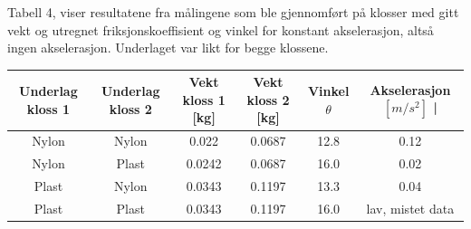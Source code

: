 \documentclass[10pt,a4paper]{report}
\begin{document}
\begin{center}
     \begin{tablenotes}
 	\small
 	\item Tabell 4, viser resultatene fra målingene som ble gjennomført på klosser med gitt vekt og utregnet friksjonskoeffisient og vinkel for konstant akselerasjon, altså ingen akselerasjon. Underlaget var likt for begge klossene.
 	\end{tablenotes}
  \begin{tabular}{| c | c | c | c | c  | c |}
    \hline
    Underlag kloss 1 & Underlag kloss 2 & Vekt kloss 1 [kg] & Vekt kloss 2 [kg] & Vinkel $\theta$ & Akselerasjon $[m/s^2]$ | \\ \hline
    Nylon & Nylon & 0.022 & 0.0687 & 12.8 & 0.12 \\ \hline
    Nylon & Plast & 0.0242 & 0.0687 & 16.0 & 0.02 \\ \hline
    Plast & Nylon & 0.0343 & 0.1197 & 13.3 & 0.04 \\ \hline
    Plast & Plast & 0.0343 & 0.1197 & 16.0 & lav, mistet data  \\ \hline
  \end{tabular}
\end{center}
\end{document}
